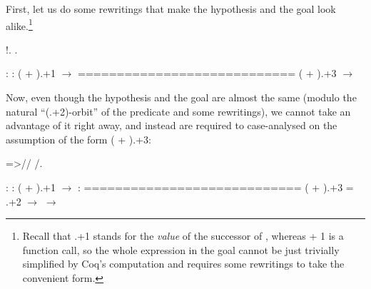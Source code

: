 First, let us do some rewritings that make the hypothesis and the goal
look alike.\footnote{Recall that .+1 stands for the \emph{value}
of the successor of ,  whereas  + 1  is a function call, so
the whole expression in the goal cannot be just trivially simplified
by Coq's computation and requires some rewritings to take the
convenient form.} \begin{coqdoccode}
\coqdocemptyline
\coqdocnoindent
{}    !.\coqdoceol
\coqdocnoindent
{}     .\coqdoceol
\coqdocemptyline
\end{coqdoccode}
\coqdoceol
\coqdocemptyline
\coqdocindent{1.00em}
 : \coqdoceol
\coqdocindent{1.00em}
 :  ( + ).+1 \ensuremath{\rightarrow} \coqdoceol
\coqdocindent{1.00em}
============================\coqdoceol
\coqdocindent{1.50em}
 ( + ).+3 \ensuremath{\rightarrow} 

\coqdocemptyline


Now, even though the hypothesis  and the goal are almost the same
(modulo the natural ``(.+2)-orbit'' of the  predicate and some
rewritings), we cannot take an advantage of it right away, and instead
are required to case-analysed on the assumption of the form  (
+ ).+3:


\begin{coqdoccode}
\coqdocemptyline
\coqdocnoindent
{}=>//  /.\coqdoceol
\coqdocemptyline
\end{coqdoccode}


\coqdoceol
\coqdocemptyline
\coqdocindent{1.00em}
 : \coqdoceol
\coqdocindent{1.00em}
 :  ( + ).+1 \ensuremath{\rightarrow} \coqdoceol
\coqdocindent{1.00em}
 : \coqdoceol
\coqdocindent{1.00em}
============================\coqdoceol
\coqdocindent{1.50em}
( + ).+3 = .+2 \ensuremath{\rightarrow}   \ensuremath{\rightarrow} 


